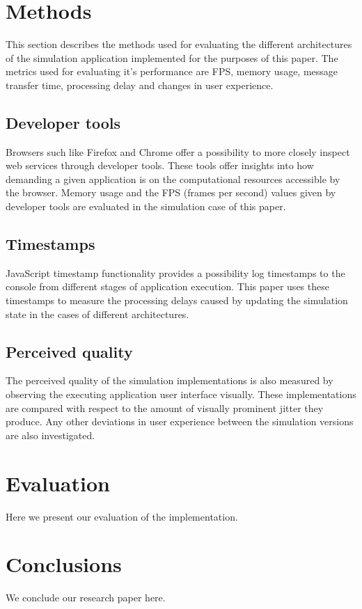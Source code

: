 \documentclass[conference]{IEEEtran}
\begin{document}
\section{Methods}
\label{sec:methods}

This section describes the methods used for evaluating the different architectures of the simulation application implemented for the purposes of this paper. The metrics used for evaluating it's performance are FPS, memory usage, message transfer time, processing delay and changes in user experience.

\subsection{Developer tools}

Browsers such like Firefox and Chrome offer a possibility to more closely inspect web services through developer tools. These tools offer insights into how demanding a given application
is on the computational resources accessible by the browser. Memory usage and the FPS (frames per second) values given by developer tools are evaluated in the simulation
case of this paper.

\subsection{Timestamps}

JavaScript timestamp functionality provides a possibility log timestamps to the console from different stages of application execution. This paper uses these timestamps to
measure the processing delays caused by updating the simulation state in the cases of different architectures.

\subsection{Perceived quality}

The perceived quality of the simulation implementations is also measured by observing the executing application user interface visually. These implementations are compared
with respect to the amount of visually prominent jitter they produce. Any other deviations in user experience between the simulation versions are also investigated.

\section{Evaluation}
\label{sec:sec2}

Here we present our evaluation of the implementation.

\section{Conclusions}
\label{sec:conc}

We conclude our research paper here.

\printbibliography[title={References}]
\end{document}
